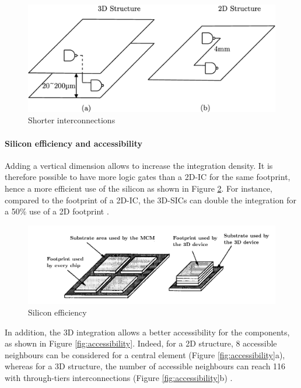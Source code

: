 \begin{figure}[h!]
\begin{center}
\includegraphics[width=0.8\linewidth]{wire.eps}
\end{center}
\vspace{-0.5cm}
\caption{Shorter interconnections \cite{659500}}
\label{fig:wire}
\end{figure}

\paragraph{Silicon efficiency and accessibility}

Adding a vertical dimension allows to increase the integration density. It is therefore possible to have more logic gates than a 2D-IC for the same footprint, hence a more efficient use of the silicon as shown in Figure \ref{fig:footprint}. For instance, compared to the footprint of a 2D-IC, the 3D-SICs can double the integration for a 50\% use of a 2D footprint \cite{659500}.

\begin{figure}[h!]
\begin{center}
\includegraphics[width=0.8\linewidth]{footprint.png}
\end{center}
\vspace{-0.5cm}
\caption{Silicon efficiency \cite{659500}}
\label{fig:footprint}
\end{figure}

In addition, the 3D integration allows a better accessibility for the components, as shown in Figure \ref{fig:accessibility}. Indeed, for a 2D structure, 8 accessible neighbours can be considered for a central element (Figure \ref{fig:accessibility}a), whereas for a 3D structure, the number of accessible neighbours can reach 116 with through-tiers interconnections (Figure \ref{fig:accessibility}b) \cite{659500}.

